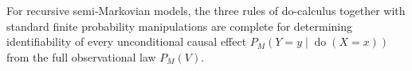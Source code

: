 For recursive semi-Markovian models, the three rules of do-calculus together with standard finite probability manipulations are complete for determining identifiability of every unconditional causal effect \(P_M(Y=y\mid\operatorname{do}(X=x))\) from the full observational law \(P_M(V)\).